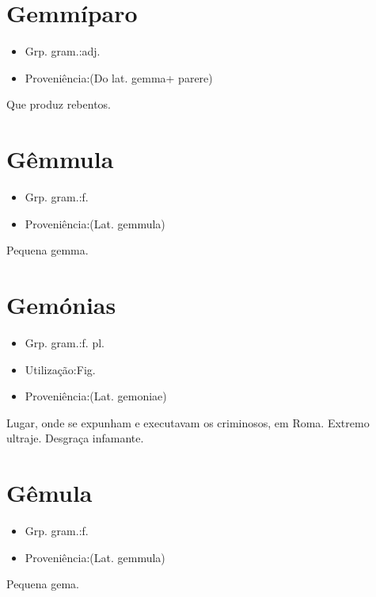 \section{Gemmíparo}
\begin{itemize}
\item {Grp. gram.:adj.}
\end{itemize}
\begin{itemize}
\item {Proveniência:(Do lat. \textunderscore gemma\textunderscore  + \textunderscore parere\textunderscore )}
\end{itemize}
Que produz rebentos.
\section{Gêmmula}
\begin{itemize}
\item {Grp. gram.:f.}
\end{itemize}
\begin{itemize}
\item {Proveniência:(Lat. \textunderscore gemmula\textunderscore )}
\end{itemize}
Pequena gemma.
\section{Gemónias}
\begin{itemize}
\item {Grp. gram.:f. pl.}
\end{itemize}
\begin{itemize}
\item {Utilização:Fig.}
\end{itemize}
\begin{itemize}
\item {Proveniência:(Lat. \textunderscore gemoniae\textunderscore )}
\end{itemize}
Lugar, onde se expunham e executavam os criminosos, em Roma.
Extremo ultraje.
Desgraça infamante.
\section{Gêmula}
\begin{itemize}
\item {Grp. gram.:f.}
\end{itemize}
\begin{itemize}
\item {Proveniência:(Lat. \textunderscore gemmula\textunderscore )}
\end{itemize}
Pequena gema.
